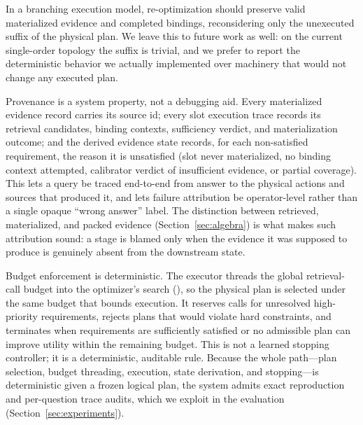 In a branching execution model, re-optimization should preserve valid
materialized evidence and completed bindings, reconsidering only the unexecuted
suffix of the physical plan. We leave this to future work as well: on the
current single-order topology the suffix is trivial, and we prefer to report
the deterministic behavior we actually implemented over machinery that would
not change any executed plan.

Provenance is a system property, not a debugging aid. Every materialized
evidence record carries its source id; every slot execution trace records its
retrieval candidates, binding contexts, sufficiency verdict, and materialization
outcome; and the derived evidence state records, for each non-satisfied
requirement, the reason it is unsatisfied (slot never materialized, no binding
context attempted, calibrator verdict of insufficient evidence, or partial
coverage). This lets a query be traced end-to-end from answer to the physical
actions and sources that produced it, and lets failure attribution be
operator-level rather than a single opaque ``wrong answer'' label. The
distinction between retrieved, materialized, and packed evidence
(Section~\ref{sec:algebra}) is what makes such attribution sound: a stage is
blamed only when the evidence it was supposed to produce is genuinely absent
from the downstream state.

Budget enforcement is deterministic. The executor threads the global
retrieval-call budget into the optimizer's search (),
so the physical plan is selected under the same budget that bounds execution.
It reserves calls for unresolved high-priority requirements, rejects plans that
would violate hard constraints, and terminates when requirements are
sufficiently satisfied or no admissible plan can improve utility within the
remaining budget. This is not a learned stopping controller; it is a
deterministic, auditable rule. Because the whole path---plan selection, budget
threading, execution, state derivation, and stopping---is deterministic given a
frozen logical plan, the system admits exact reproduction and per-question
trace audits, which we exploit in the evaluation (Section~\ref{sec:experiments}).
